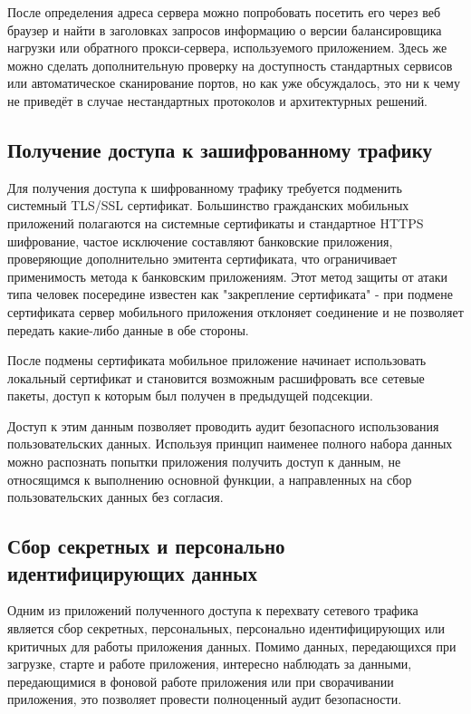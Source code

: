 После определения адреса сервера можно попробовать посетить его через веб браузер и найти в заголовках запросов информацию о версии балансировщика нагрузки или обратного прокси-сервера, используемого приложением. Здесь же можно сделать дополнительную проверку на доступность стандартных сервисов или автоматическое сканирование портов, но как уже обсуждалось, это ни к чему не приведёт в случае нестандартных протоколов и архитектурных решений.

\subsection{Получение доступа к зашифрованному трафику}

Для получения доступа к шифрованному трафику требуется подменить системный TLS/SSL сертификат. Большинство гражданских мобильных приложений полагаются на системные сертификаты и стандартное HTTPS шифрование, частое исключение составляют банковские приложения, проверяющие дополнительно эмитента сертификата, что ограничивает применимость метода к банковским приложениям. Этот метод защиты от атаки типа человек посередине известен как "закрепление сертификата" - при подмене сертификата сервер мобильного приложения отклоняет соединение и не позволяет передать какие-либо данные в обе стороны.

После подмены сертификата мобильное приложение начинает использовать локальный сертификат и становится возможным расшифровать все сетевые пакеты, доступ к которым был получен в предыдущей подсекции.

Доступ к этим данным позволяет проводить аудит безопасного использования пользовательских данных. Используя принцип наименее полного набора данных можно распознать попытки приложения получить доступ к данным, не относящимся к выполнению основной функции, а направленных на сбор пользовательских данных без согласия.

\subsection{Сбор секретных и персонально идентифицирующих данных}

Одним из приложений полученного доступа к перехвату сетевого трафика является сбор секретных, персональных, персонально идентифицирующих или критичных для работы приложения данных. Помимо данных, передающихся при загрузке, старте и работе приложения, интересно наблюдать за данными, передающимися в фоновой работе приложения или при сворачивании приложения, это позволяет провести полноценный аудит безопасности.

